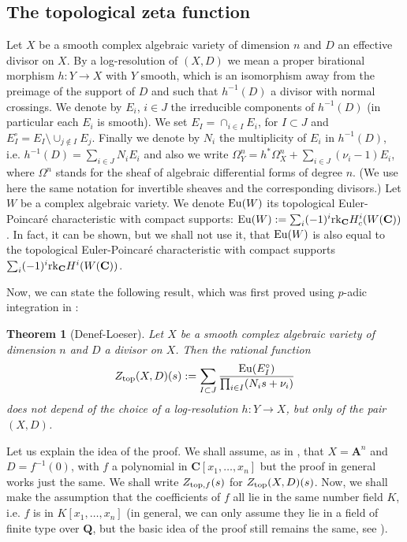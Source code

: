 \documentclass[english,12pt]{amsart}
\def\AA{{\mathbf A}}
\def\CC{{\mathbf C}}
\def\QQ{{\mathbf Q}}
\newtheorem{theorem}[subsubsection]{Theorem}
\theoremstyle{definition}
\theoremstyle{remark}
\theoremstyle{plain}
\numberwithin{equation}{subsection}
\def\AA{{\mathbf A}}
\def\CC{{\mathbf C}}
\def\QQ{{\mathbf Q}}
\begin{document}
\subsection{The topological zeta function}\label{tzf}Let $X$ be a
smooth complex algebraic variety of dimension $n$
and $D$ an effective divisor on $X$. By a log-resolution of $(X, D)$
we mean a proper birational morphism
$h : Y \rightarrow X$ with $Y$ smooth, which is an isomorphism away from
the preimage of the support of $D$
and such that $h^{-1}( D)$ a divisor with normal crossings.
We denote by  $E_i$, $i \in J$ the irreducible components
of $h^{-1}( D)$ (in particular each  $E_i$ is smooth).
We set $E_I = \cap_{i \in I}E_i$, for $I \subset J$ and
$E_I^{\circ} = E_I \setminus \cup_{j \notin I}E_j$. Finally we denote by
$N_i$ the multiplicity of $E_i$ in $h^{-1}(D)$, i.e.
$h^{-1}(D) = \sum_{i \in J} N_i E_i$
and also we write
$\Omega^n_Y = h^{*}\Omega^n_X + \sum_{i \in J}(\nu_i - 1) E_i$,
where $\Omega^n$
stands for the sheaf of algebraic differential forms of degree $n$.
(We  use here the same notation for invertible sheaves and the
corresponding divisors.)
Let $W$  be a complex algebraic variety.
We denote ${\rm Eu} (W)$
its topological  Euler-Poincar\'e characteristic with compact supports:
${\rm Eu}  (W) := \sum_i (-1)^i {\rm rk}_{\CC} H^i_c (W (\CC))$. 
In fact, it can be shown, but we shall not use it, that 
${\rm Eu}  (W) $ is also equal to the
topological  Euler-Poincar\'e characteristic with compact supports
$ \sum_i (-1)^i {\rm rk}_{\CC} H^i (W (\CC))$.


Now, we can state the following result, which was first proved
using $p$-adic integration in \cite{jams92}:


\begin{theorem}[Denef-Loeser]\label{ttt}Let $X$ be a smooth complex algebraic variety of dimension $n$
and $D$ a divisor on $X$. Then
the rational function
\begin{equation}\label{tft}
Z_{\rm top} (X, D)(s) :=
\sum_{I \subset J}
\frac{{\rm Eu}(E_I^{\circ})}{\prod_{i \in I}(N_i s + \nu_i)}
\end{equation}
does not depend of the choice of a log-resolution $h : Y \rightarrow X$,
but only of the pair $(X, D)$.
\end{theorem}




Let us explain the idea of the proof.
We shall  assume, as in \cite{jams92}, that $X = \AA^n$
and $D = f^{-1} (0)$, with $f$ a polynomial in $\CC [x_1, \dots, x_n]$
but
the proof in general works just the same.
We shall write $Z_{{\rm top}, f} (s)$ for $Z_{\rm top} (X, D)(s)$.
Now, we shall make the assumption that the coefficients of $f$
all lie in the same number field
$K$, i.e. $f $ is in $K [x_1, \dots, x_n] $
(in general, we can only assume
they lie in a field of finite type over
$\QQ$, but the basic idea of the proof still remains the
same, see \cite{jams92}).
\end{document}
